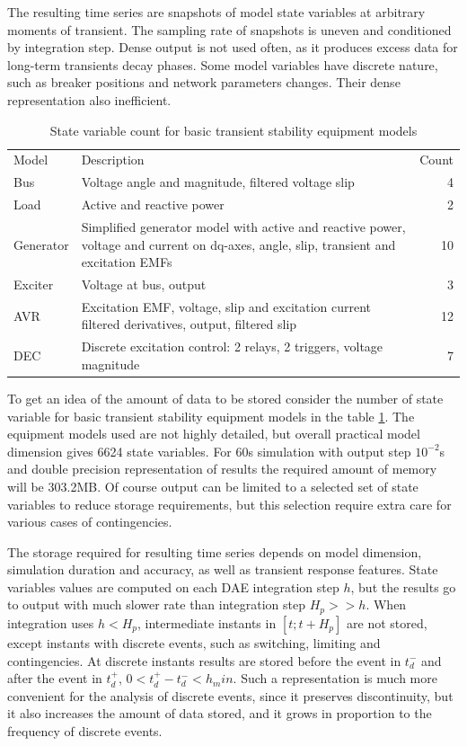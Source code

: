 \documentclass[lettersize,journal]{IEEEtran}
\begin{document}
The resulting time series are snapshots of model state variables at arbitrary moments of transient.
The sampling rate of snapshots is uneven and conditioned by integration step. Dense output is not used often, as it 
produces excess data for long-term transients decay phases. Some model variables have discrete nature, such
as breaker positions and network parameters changes. Their dense representation also inefficient.

\begin{table}[!h]
	\caption{State variable count for basic transient stability equipment models\label{tab:statvarscount}}
	\centering
	\begin{tabularx}{\columnwidth}{l|X|r}
		\hline
		Model & Description & Count\\
		\hlineB{3}	
		Bus & Voltage angle and magnitude, filtered voltage slip & 4\\
		\hline
		Load & Active and reactive power & 2\\
		\hline
		Generator & Simplified generator model with active and reactive power, voltage and current on dq-axes, 
		angle, slip, transient and excitation EMFs & 10\\
		\hline
		Exciter & Voltage at bus, output & 3\\
		\hline
		AVR & Excitation EMF, voltage, slip and excitation current filtered derivatives, output, filtered slip & 12\\
		\hline
		DEC & Discrete excitation control: 2 relays, 2 triggers, voltage magnitude & 7\\
		\hline
	\end{tabularx}
\end{table}

To get an idea of the amount of data to be stored consider the number of state variable for basic transient 
stability equipment models in the table \ref{tab:statvarscount}. The equipment models used are not 
highly detailed, but overall practical model dimension gives 6624 state variables. For 60s simulation with
output step \(10^{-2}\)s and double precision representation of results the required amount of memory will be 303.2MB.
Of course output can be limited to a selected set of state variables to reduce storage requirements,
but this selection require extra care for various cases of contingencies.

The storage required for resulting time series depends on model dimension, simulation duration
and accuracy, as well as transient response features. State variables values are computed on each DAE integration
step \(h\), but the results go to output with much slower rate than integration step \(H_p>>h\). 
When integration uses \(h<H_p\), intermediate instants in \([t;t+H_p]\) are not stored, except
instants with discrete events, such as switching, limiting and contingencies. At discrete instants
results are stored before the event in \(t_d^-\) and after the event in \(t_d^+\), \(0<t_d^+-t_d^-<h_min\).
Such a representation is much more convenient for the analysis of discrete events, since it preserves
discontinuity, but it also increases the amount of data stored, and it grows in proportion to the 
frequency of discrete events.
\end{document}
